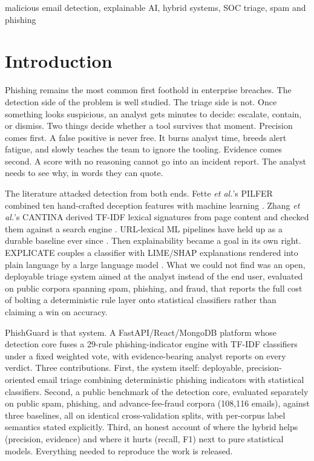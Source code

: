 \documentclass[conference]{IEEEtran}
\begin{document}
\begin{IEEEkeywords}
malicious email detection, explainable AI, hybrid systems, SOC triage, spam
and phishing
\end{IEEEkeywords}

\section{Introduction}
Phishing remains the most common first foothold in enterprise breaches. The
detection side of the problem is well studied. The triage side is not. Once
something looks suspicious, an analyst gets minutes to decide: escalate,
contain, or dismiss. Two things decide whether a tool survives that moment.
Precision comes first. A false positive is never free. It burns analyst time,
breeds alert fatigue, and slowly teaches the team to ignore the tooling.
Evidence comes second. A score with no reasoning cannot go into an incident
report. The analyst needs to see why, in words they can quote.

The literature attacked detection from both ends. Fette \textit{et al.}'s
PILFER combined ten hand-crafted deception features with machine learning
\cite{pilfer}. Zhang \textit{et al.}'s CANTINA derived TF-IDF lexical
signatures from page content and checked them against a search engine
\cite{cantina}. URL-lexical ML pipelines have held up as a durable baseline
ever since \cite{sahingoz2019}. Then explainability became a goal in its own
right. EXPLICATE couples a classifier with LIME/SHAP explanations rendered
into plain language by a large language model \cite{explicate}. What we could
not find was an open, deployable triage system aimed at the analyst instead
of the end user, evaluated on public corpora spanning spam, phishing, and
fraud, that reports the full cost of bolting a deterministic rule layer onto
statistical classifiers rather than claiming a win on accuracy.

PhishGuard is that system. A FastAPI/React/MongoDB platform whose detection
core fuses a 29-rule phishing-indicator engine with TF-IDF classifiers under
a fixed weighted vote, with evidence-bearing analyst reports on every
verdict. Three contributions. First, the system itself: deployable,
precision-oriented email triage combining deterministic phishing indicators
with statistical classifiers. Second, a public benchmark of the detection
core, evaluated separately on public spam, phishing, and advance-fee-fraud
corpora (108,116 emails), against three baselines, all on identical
cross-validation splits, with per-corpus label semantics stated explicitly.
Third, an honest account of where the hybrid helps (precision, evidence) and
where it hurts (recall, F1) next to pure statistical models. Everything
needed to reproduce the work is released.
\end{document}
